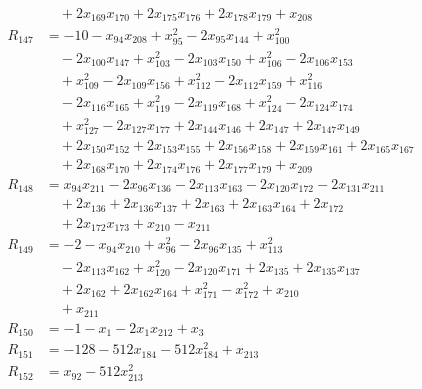 \begin{align*}
&\quad +2x_{169}x_{170} +2x_{175}x_{176} +2x_{178}x_{179} +x_{208}\\
R_{147} &= -10 -x_{94}x_{208} +x_{95}^{2} -2x_{95}x_{144} +x_{100}^{2}\\
&\quad -2x_{100}x_{147} +x_{103}^{2} -2x_{103}x_{150} +x_{106}^{2} -2x_{106}x_{153}\\
&\quad +x_{109}^{2} -2x_{109}x_{156} +x_{112}^{2} -2x_{112}x_{159} +x_{116}^{2}\\
&\quad -2x_{116}x_{165} +x_{119}^{2} -2x_{119}x_{168} +x_{124}^{2} -2x_{124}x_{174}\\
&\quad +x_{127}^{2} -2x_{127}x_{177} +2x_{144}x_{146} +2x_{147} +2x_{147}x_{149}\\
&\quad +2x_{150}x_{152} +2x_{153}x_{155} +2x_{156}x_{158} +2x_{159}x_{161} +2x_{165}x_{167}\\
&\quad +2x_{168}x_{170} +2x_{174}x_{176} +2x_{177}x_{179} +x_{209}\\
R_{148} &= x_{94}x_{211} -2x_{96}x_{136} -2x_{113}x_{163} -2x_{120}x_{172} -2x_{131}x_{211}\\
&\quad +2x_{136} +2x_{136}x_{137} +2x_{163} +2x_{163}x_{164} +2x_{172}\\
&\quad +2x_{172}x_{173} +x_{210} -x_{211}\\
R_{149} &= -2 -x_{94}x_{210} +x_{96}^{2} -2x_{96}x_{135} +x_{113}^{2}\\
&\quad -2x_{113}x_{162} +x_{120}^{2} -2x_{120}x_{171} +2x_{135} +2x_{135}x_{137}\\
&\quad +2x_{162} +2x_{162}x_{164} +x_{171}^{2} -x_{172}^{2} +x_{210}\\
&\quad +x_{211}\\
R_{150} &= -1 -x_{1} -2x_{1}x_{212} +x_{3}\\
R_{151} &= -128 -512x_{184} -512x_{184}^{2} +x_{213}\\
R_{152} &= x_{92} -512x_{213}^{2}
\end{align*}
\endgroup
